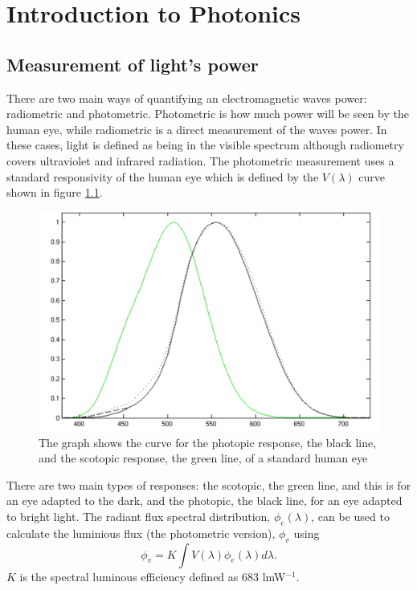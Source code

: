 \chapter{Introduction to Photonics}
\minitoc
\pagebreak
\section{Measurement of light's power}
There are two main ways of quantifying an electromagnetic waves power: radiometric and photometric.
Photometric is how much power will be seen by the human eye, while radiometric is a direct measurement of the waves power.
In these cases, light is defined as being in the visible spectrum although radiometry covers ultraviolet and infrared radiation.
The photometric measurement uses a standard responsivity of the human eye which is defined by the $V(\lambda)$ curve  shown in figure \ref{fig:eye}.
\begin{figure}[H]
	\includegraphics[width=\linewidth]{eye}
	\caption{The graph shows the curve for the photopic response, the black line, and the scotopic response, the green line, of a standard human eye}
	\label{fig:eye}
\end{figure}
There are two main types of responses: the scotopic, the green line, and this is for an eye adapted to the dark, and the photopic, the black line, for an eye adapted to bright light.
The radiant flux spectral distribution, $\phi_e(\lambda)$, can be used to calculate the luminious flux (the photometric version), $\phi_v$ using 
\begin{equation}
\phi_v = K\int{V(\lambda)\phi_e(\lambda)d\lambda}.
\label{eq:luminous}
\end{equation}
$K$ is the spectral luminous efficiency defined as 683 lmW$^{-1}$.
